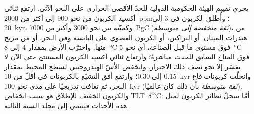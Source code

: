 يجري تقييم الهيئة الحكومية الدولية للحدّ الأقصى الحراري على النحو الآتي. ارتفع ثنائي أكسيد الكربون من نحو 900 إلى أكثر من
\qty{2000}{ppm}؛ وأُطلق الكربون في 3 إلى \qty{20}{kyr}، وكميّته بين نحو 3000 وأكثر من
\qty{7000}{PgC} (\emph{ثقة منخفضة إلى متوسطة})، من هيدرات الميثان، أو البراكين، أو الكربون العضوي
على اليابسة وفي البحر، أو من مزيج منها. واحترّت الأرض بمقدار 4 إلى \qty{8}{\celsius} فوق مستوى
ما قبل الصناعة، أي نحو \qty{5}{\celsius} فوق المناخ السابق للحدث مباشرةً؛ وارتفاع ثنائي أكسيد الكربون
المستنتج حتى الآن لا يفسّر إلا نحو نصف ذلك الاحترار. وانخفض الأسّ الهيدروجيني لسطح المحيط
بمقدار 0.15 إلى 0.30؛ وارتفع أفق التشبّع بالكربونات في أقلّ من \qty{10}{kyr} وانحلّت كربونات
قاع البحر، ثم تعافت تدريجيًا على مدى نحو \qty{100}{kyr} (\emph{ثقة متوسطة}
بأن ذلك كان عالميًا). والكربون الخفيف للإطلاق هو سبب انخفاض \mbox{\textdir TLT $\delta^{13}$C}: أمّا سجلّ نظائر
الكربون لمثل هذه الأحداث فينتمي إلى مجلد السنة الثالثة.

\begin{omfigure}
\centering
{}
\par{}
\end{omfigure}


